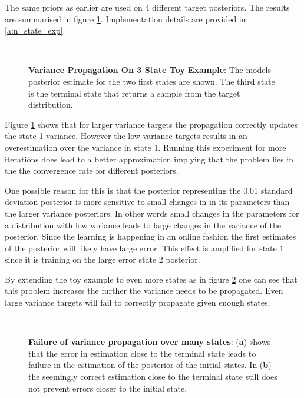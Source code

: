 The same priors as earlier are used on 4 different target posteriors. The results are summarised in figure \ref{fig:3stateproptest}. Implementation details are provided in \ref{a:n_state_exp}.

\begin{figure}[H]
    \centering

    \\
    \caption{\textbf{Variance Propagation On 3 State Toy Example}: The models posterior estimate for the two first states are shown. The third state is the terminal state that returns a sample from the target distribution.}
    \label{fig:3stateproptest}
\end{figure}

Figure \ref{fig:3stateproptest} shows that for larger variance targets the propagation correctly updates the state 1 variance. However the low variance targets results in an overestimation over the variance in state 1. Running this experiment for more iterations does lead to a better approximation implying that the problem lies in the the convergence rate for different posteriors. 

One possible reason for this is that the posterior representing the 0.01 standard deviation posterior is more sensitive to small changes in in its parameters than the larger variance posteriors. In other words small changes in the parameters for a distribution with low variance leads to large changes in the variance of the posterior. Since the learning is happening in an online fashion the first estimates of the posterior will likely have large error. This effect is amplified for state 1 since it is training on the large error state 2 posterior.

By extending the toy example to even more states as in figure \ref{fig:longproptest} one can see that this problem increases the further the variance needs to be propagated. Even large variance targets will fail to correctly propagate given enough states.

\begin{figure}[H]
    \centering
    \\
    \caption{\textbf{Failure of variance propagation over many states}: (\textbf{a}) shows that the error in estimation close to the terminal state leads to failure in the estimation of the posterior of the initial states. In (\textbf{b}) the seemingly correct estimation close to the terminal state still does not prevent errors closer to the initial state.}
    \label{fig:longproptest}
\end{figure}

